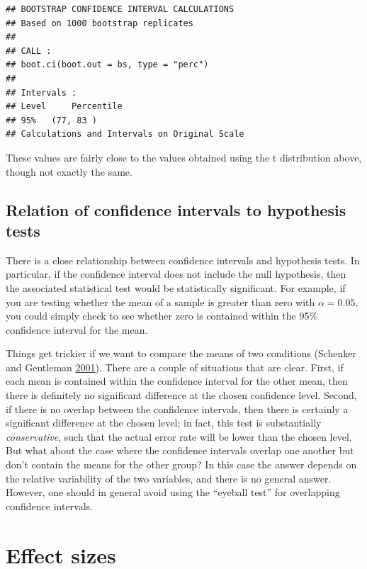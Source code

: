 \documentclass[12pt,]{book}
\theoremstyle{definition}
\theoremstyle{definition}
\theoremstyle{definition}
\theoremstyle{remark}
\begin{document}
\begin{verbatim}
## BOOTSTRAP CONFIDENCE INTERVAL CALCULATIONS
## Based on 1000 bootstrap replicates
## 
## CALL : 
## boot.ci(boot.out = bs, type = "perc")
## 
## Intervals : 
## Level     Percentile     
## 95%   (77, 83 )  
## Calculations and Intervals on Original Scale
\end{verbatim}

These values are fairly close to the values obtained using the t distribution above, though not exactly the same.

\hypertarget{relation-of-confidence-intervals-to-hypothesis-tests}{%
\subsection{Relation of confidence intervals to hypothesis tests}\label{relation-of-confidence-intervals-to-hypothesis-tests}}

There is a close relationship between confidence intervals and hypothesis tests. In particular, if the confidence interval does not include the null hypothesis, then the associated statistical test would be statistically significant. For example, if you are testing whether the mean of a sample is greater than zero with \(\alpha = 0.05\), you could simply check to see whether zero is contained within the 95\% confidence interval for the mean.

Things get trickier if we want to compare the means of two conditions (Schenker and Gentleman \protect\hyperlink{ref-sche:gent:2001}{2001}). There are a couple of situations that are clear. First, if each mean is contained within the confidence interval for the other mean, then there is definitely no significant difference at the chosen confidence level. Second, if there is no overlap between the confidence intervals, then there is certainly a significant difference at the chosen level; in fact, this test is substantially \emph{conservative}, such that the actual error rate will be lower than the chosen level. But what about the case where the confidence intervals overlap one another but don't contain the means for the other group? In this case the answer depends on the relative variability of the two variables, and there is no general answer. However, one should in general avoid using the ``eyeball test'' for overlapping confidence intervals.

\hypertarget{effect-sizes}{%
\section{Effect sizes}\label{effect-sizes}}
\end{document}
